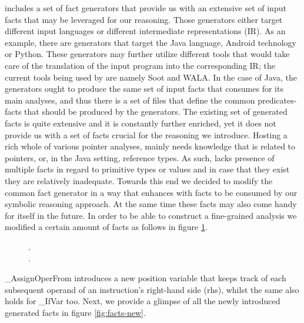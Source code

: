 \doop{} includes a set of fact generators that provide us with an
extensive set of input facts that may be leveraged for our reasoning.
Those generators either target different input languages or different
intermediate representations (IR). As an example, there are generators
that target the Java language, Android technology or Python. These
generators may further utilize different tools that would take care of
the translation of the input program into the corresponding IR; the
current tools being used by \doop{} are namely Soot and WALA. In the case of
Java, the generators ought to produce the same set of input facts
that \doop{} consumes for its main analyses, and thus there is a set
of files that define the common predicates-facts that should be
produced by the generators. The existing set of generated
facts is quite extensive and it is constantly further enriched, yet it
does not provide us with a set of facts crucial for the reasoning
we introduce. Hosting a rich whole of various pointer analyses,
\doop{} mainly needs knowledge that is related to pointers, or,
in the Java setting, reference types. As such, \doop{} lacks
presence of multiple facts in regard to primitive types or
values and in case that they exist they are relatively
inadequate. Towards this end we decided to modify the common fact
generator in a way that enhances \doop{} with facts to be consumed
by our symbolic reasoning approach.
At the same time these facts may also come handy for \doop{} itself
in the future. In order to be able to construct a fine-grained
analysis we modified a certain amount of facts as follows in figure \ref{fig:facts-modified}.

\begin{figure}[th]
  \centering
{}.\\
.
\label{fig:facts-modified}
\end{figure}

\_AssignOperFrom introduces a new position variable that keeps track of
each subsequent operand of an instruction's right-hand side (rhs), whilst
the same also holds for \_IfVar too. Next, we provide a glimpse of all the
newly introduced generated facts in figure \ref{fig:facts-new}.

